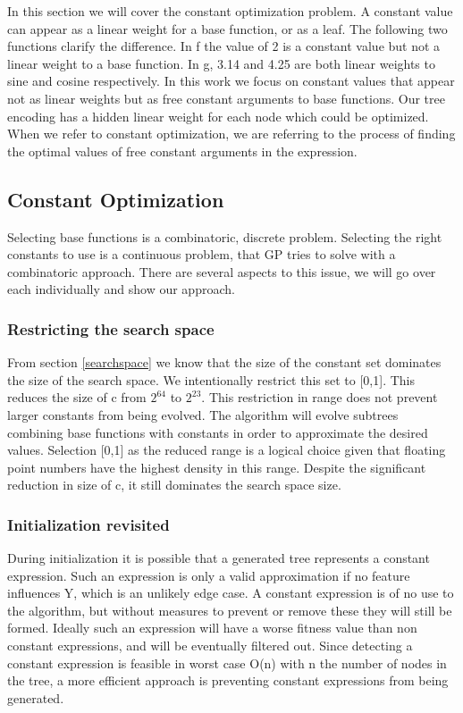 In this section we will cover the constant optimization problem. A constant value can appear as a linear weight for a base function, or as a leaf. The following two functions clarify the difference.
In f the value of 2 is a constant value but not a linear weight to a base function. In g, 3.14 and 4.25 are both linear weights to sine and cosine respectively. In this work we focus on constant values that appear not as linear weights but as free constant arguments to base functions. Our tree encoding has a hidden linear weight for each node which could be optimized. When we refer to constant optimization, we are referring to the process of finding the optimal values of free constant arguments in the expression.

\subsection{Constant Optimization} \label{subconstantoptimization}
Selecting base functions is a combinatoric, discrete problem. Selecting the right constants to use is a continuous problem, that GP tries to solve with a combinatoric approach. There are several aspects to this issue, we will go over each individually and show our approach. 

\subsubsection{Restricting the search space}
From section \ref{searchspace} we know that the size of the constant set dominates the size of the search space. We intentionally restrict this set to [0,1]. This reduces the size of c from $2^{64}$ to $2^{23}$. This restriction in range does not prevent larger constants from being evolved. The algorithm will evolve subtrees combining base functions with constants in order to approximate the desired values. Selection [0,1] as the reduced range is a logical choice given that floating point numbers have the highest density in this range. Despite the significant reduction in size of c, it still dominates the search space size.

\subsubsection{Initialization revisited}
During initialization it is possible that a generated tree represents a constant expression. Such an expression is only a valid approximation if no feature influences Y, which is an unlikely edge case. A constant expression is of no use to the algorithm, but without measures to prevent or remove these they will still be formed. Ideally such an expression will have a worse fitness value than non constant expressions, and will be eventually filtered out. Since detecting a constant expression is feasible in worst case O(n) with n the number of nodes in the tree, a more efficient approach is preventing constant expressions from being generated. 


